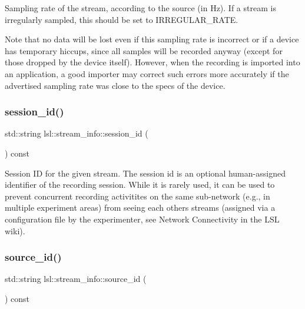 Sampling rate of the stream, according to the source (in Hz). If a stream is irregularly sampled, this should be set to I\+R\+R\+E\+G\+U\+L\+A\+R\+\_\+\+R\+A\+TE.

Note that no data will be lost even if this sampling rate is incorrect or if a device has temporary hiccups, since all samples will be recorded anyway (except for those dropped by the device itself). However, when the recording is imported into an application, a good importer may correct such errors more accurately if the advertised sampling rate was close to the specs of the device. \mbox{\label{classlsl_1_1stream__info_a59036c0e83bcb07b711ec7e3e3b15fef}} 
\subsubsection{\texorpdfstring{session\+\_\+id()}{session\_id()}}
{\footnotesize\ttfamily std\+::string lsl\+::stream\+\_\+info\+::session\+\_\+id (\begin{DoxyParamCaption}{ }\end{DoxyParamCaption}) const\hspace{0.3cm}{\ttfamily [inline]}}

Session ID for the given stream. The session id is an optional human-\/assigned identifier of the recording session. While it is rarely used, it can be used to prevent concurrent recording activitites on the same sub-\/network (e.\+g., in multiple experiment areas) from seeing each other\textquotesingle{}s streams (assigned via a configuration file by the experimenter, see Network Connectivity in the L\+SL wiki). \mbox{\label{classlsl_1_1stream__info_a1f20c68246a88047978d9b03e14a9d2b}} 
\subsubsection{\texorpdfstring{source\+\_\+id()}{source\_id()}}
{\footnotesize\ttfamily std\+::string lsl\+::stream\+\_\+info\+::source\+\_\+id (\begin{DoxyParamCaption}{ }\end{DoxyParamCaption}) const\hspace{0.3cm}{\ttfamily [inline]}}

